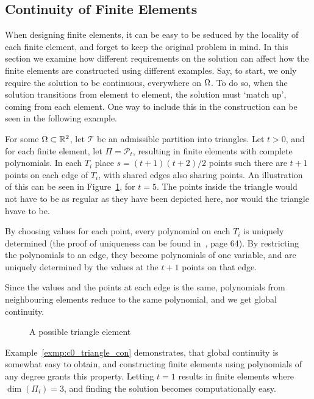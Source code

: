 \subsection{Continuity of Finite Elements}
When designing finite elements, it can be easy to be seduced by the 
locality of each finite element, and forget to keep the original 
problem in mind. In this section we examine how different requirements 
on the solution can affect how the finite elements are constructed 
using different examples.
Say, to start, we only require the solution to be continuous, 
everywhere on $\Omega$.
To do so, when the solution transitions from element to element, 
the solution must `match up', coming from each element. 
One way to include this in the construction can be seen in the 
following example.
\begin{exmp}{\quad\label{exmp:c0_triangle_con}}
For some $\Omega\subset \mathbb{R}^2$, let $\mathcal{T}$ be an admissible partition into 
triangles. 
Let $t >0$, and for each finite element, let $\Pi = \mathcal{P}_t$, resulting 
in finite elements with complete polynomials.
In each $T_i$ place
$s = (t+1)(t+2)/2$ points such 
there are $t+1$ points on each edge of $T_i$, with shared edges also 
sharing points.
An illustration of this can be seen in Figure~\ref{fig:triangle_nodal}, for 
$t=5$.
The points inside the triangle would not have to be as regular as they 
have been depicted here, nor would the triangle hvave to be.

By choosing values for each point, every polynomial on each $T_i$ 
is uniquely determined (the proof of uniqueness can be found in~\cite{Braess}, page 64).
By restricting the polynomials to an edge, they become polynomials of 
one variable, and are uniquely determined by the values at the $t+1$ points 
on that edge.

Since the values and the points at each edge is the same, polynomials from 
neighbouring elements reduce to the same polynomial, and we get global 
continuity.
\end{exmp}
\begin{figure}[ht]
    \centering
    
    \caption{A possible triangle element}\label{fig:triangle_nodal}
\end{figure}
Example~\ref{exmp:c0_triangle_con} demonstrates, that global continuity is 
somewhat easy to obtain, and constructing finite elements using polynomials 
of any degree grants this property. Letting $t=1$ results in finite elements 
where $\dim(\Pi_i)=3$, and finding the solution becomes computationally 
easy.

